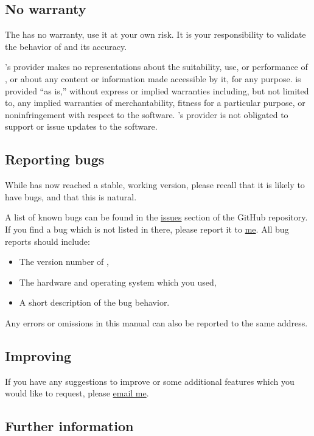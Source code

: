 \documentclass{ol-softwaremanual}
\begin{document}
\subsection{No warranty}

The \thel has no warranty, use it at your own risk. It is your responsibility to validate the behavior of \thel and its accuracy. 

\thel's provider makes no representations about the
suitability, use, or performance of \thel, or about any
content or information made accessible by it, for any
purpose. \thel is provided ``as is,'' without express or
implied warranties including, but not limited to, any implied
warranties of merchantability, fitness for a particular purpose, or
noninfringement with respect to the software. \thel's provider is not
obligated to support or issue updates to the software.

\subsection{Reporting bugs}

While \thel has now reached a stable, working version, please recall that it is likely to have bugs, and that this is natural. 

A list of known bugs can be found in the \href{\issuesurl}{issues} section of the GitHub repository.
If you find a bug which is not listed in there, please report it to \href{mailto:michele.castellana@gmail.com}{me}. All bug reports should include:
\begin{itemize}
    \item The version number of \thel, 
    \item The hardware and operating system which you used, 
    \item A short description of the bug behavior. 

\end{itemize}

Any errors or omissions in this manual can also be reported to the same address.

\subsection{Improving \thel}

If you have any suggestions to improve \thel or some additional features which you would like to request, please \href{\contactemail}{email me}. 

\subsection{Further information}
\end{document}
